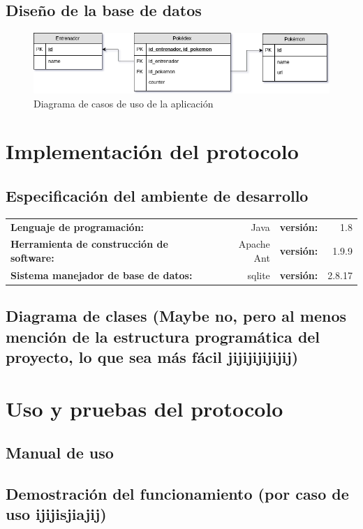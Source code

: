\documentclass[12pt]{article}
\begin{document}
\subsection{Diseño de la base de datos}
 \begin{figure}[H]
   \centering
   \includegraphics[width=1\textwidth]{PokeDB2}
   \caption{Diagrama de casos de uso de la aplicación}
 \end{figure}
\section{Implementación del protocolo}
\subsection{Especificación del ambiente de desarrollo}
\begin{tabular}{l r l r}
\textbf{Lenguaje de programación:} & Java & \textbf{versión:} & 1.8 \\
\textbf{Herramienta de construcción de software:} & Apache Ant & \textbf{versión:} & 1.9.9 \\
\textbf{Sistema manejador de base de  datos:} & sqlite & \textbf{versión:} & 2.8.17 \\
\end{tabular}
  \subsection{Diagrama de clases (Maybe no, pero al menos mención de la estructura programática del proyecto, lo que sea más fácil jijijijijijij)}

\section{Uso y pruebas del protocolo}
\subsection{Manual de uso}
\subsection{Demostración del funcionamiento (por caso de uso ijijisjiajij)}
\end{document}
